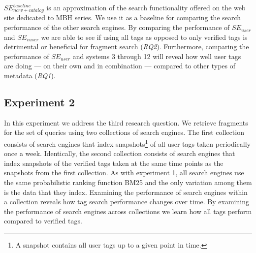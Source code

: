 \noindent
$SE_{ncrv+catalog}^{baseline}$ is an approximation of the search functionality offered on the web site dedicated to MBH series. We use it as a baseline for comparing the search performance of the other search engines. By comparing the performance of $SE_{user}$ and $SE_{vuser}$ we are able to see if using all tags as opposed to only verified tags is detrimental or beneficial for fragment search (\textit{RQ2}). Furthermore, comparing the performance of $SE_{user}$ and systems 3 through 12 will reveal how well user tags are doing --- on their own and in combination --- compared to other types of metadata (\textit{RQ1}).


\subsection{Experiment 2} \label{sec:experiment2-setup}
In this experiment we address the third research question. We retrieve fragments for the set of queries using two collections of search engines. The first collection consists of search engines that index snapshots\footnote{A snapshot contains all user tags up to a given point in time.} of all user tags taken periodically once a week. Identically, the second collection consists of search engines that index snapshots of the verified tags taken at the same time points as the snapshots from the first collection. As with experiment 1, all search engines use the same probabilistic ranking function BM25 and the only variation among them is the data that they index. Examining the performance of search engines within a collection reveals how tag search performance changes over time. By examining the performance of search engines across collections we learn how all tags perform compared to verified tags.

